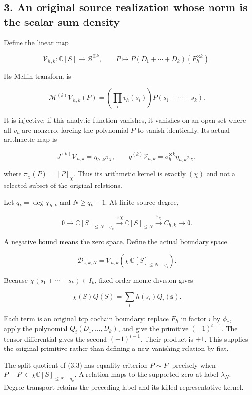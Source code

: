\documentclass[
]{article}
\begin{document}
\subsection{3. An original source realization whose norm is the scalar
sum
density}\label{an-original-source-realization-whose-norm-is-the-scalar-sum-density}

Define the linear map

\[\boxed{\mathcal V_{h,k}:\mathbb C[S]\to\mathscr B^{\otimes k},\qquad
P\mapsto P(D_1+\cdots+D_k)(F_h^{\otimes k}).}\tag{3.1}\]

Its Mellin transform is

\[\mathcal M^{(k)}\mathcal V_{h,k}(P)
=\left(\prod_i v_h(s_i)\right)P(s_1+\cdots+s_k).\]

It is injective: if this analytic function vanishes, it vanishes on an
open set where all \(v_h\) are nonzero, forcing the polynomial \(P\) to
vanish identically. Its actual arithmetic map is

\[\boxed{J^{(k)}\mathcal V_{h,k}=\eta_{h,k}\pi_\chi,\qquad
q^{(k)}\mathcal V_{h,k}=\sigma_h^{\otimes k}\eta_{h,k}\pi_\chi,}\tag{3.2}\]

where \(\pi_\chi(P)=[P]_\chi\). Thus its arithmetic kernel is exactly
\((\chi)\) and not a selected subset of the original relations.

Let \(q_k=\deg\chi_{h,k}\) and \(N\ge q_k-1\). At finite source degree,

\[\boxed{0\to\mathbb C[S]_{\le N-q_k}\xrightarrow{\times\chi}
\mathbb C[S]_{\le N}\xrightarrow{\pi_\chi}C_{h,k}\to0.}\tag{3.3}\]

A negative bound means the zero space. Define the actual boundary space

\[\mathcal D_{h,k,N}=\mathcal V_{h,k}(\chi\,\mathbb C[S]_{\le N-q_k}).\]

Because \(\chi(s_1+\cdots+s_k)\in I_k\), fixed-order monic division
gives

\[\chi(S)Q(S)=\sum_i h(s_i)Q_i(\mathbf s).\tag{3.4}\]

Each term is an original top cochain boundary: replace \(F_h\) in factor
\(i\) by \(\phi_*\), apply the polynomial \(Q_i(D_1,\ldots,D_k)\), and
give the primitive \((-1)^{i-1}\). The tensor differential gives the
second \((-1)^{i-1}\). Their product is \(+1\). This supplies the
original primitive rather than defining a new vanishing relation by
fiat.

The split quotient of (3.3) has equality criterion \(P\sim P'\)
precisely when \(P-P'\in\chi\mathbb C[S]_{\le N-q_k}\). A relation maps
to the supported zero at label \(\lambda_N\). Degree transport retains
the preceding label and its killed-representative kernel.
\end{document}
